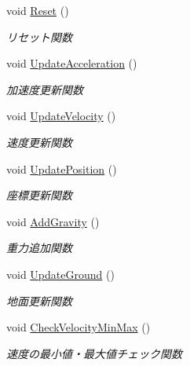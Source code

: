 \begin{DoxyCompactItemize}
\item 
void \mbox{\hyperlink{class_physics_a7ba30ff9f5a0a0a12616ed861f68a20f}{Reset}} ()
\begin{DoxyCompactList}\small\item\em リセット関数 \end{DoxyCompactList}\item 
void \mbox{\hyperlink{class_physics_a122041053c2c4e69cdf6dc92076e1d79}{Update\+Acceleration}} ()
\begin{DoxyCompactList}\small\item\em 加速度更新関数 \end{DoxyCompactList}\item 
void \mbox{\hyperlink{class_physics_abd74d6413b1fd6c77007edf51ea9db4b}{Update\+Velocity}} ()
\begin{DoxyCompactList}\small\item\em 速度更新関数 \end{DoxyCompactList}\item 
void \mbox{\hyperlink{class_physics_a481f06d777c1b1f52dc2c06c71e93932}{Update\+Position}} ()
\begin{DoxyCompactList}\small\item\em 座標更新関数 \end{DoxyCompactList}\item 
void \mbox{\hyperlink{class_physics_a5fb75ffa48210f4e01ab5a199626a3d5}{Add\+Gravity}} ()
\begin{DoxyCompactList}\small\item\em 重力追加関数 \end{DoxyCompactList}\item 
void \mbox{\hyperlink{class_physics_a085300405839f6de506bfe5d0a57fdd5}{Update\+Ground}} ()
\begin{DoxyCompactList}\small\item\em 地面更新関数 \end{DoxyCompactList}\item 
void \mbox{\hyperlink{class_physics_af6ad00988f0aa878285b930121d4748c}{Check\+Velocity\+Min\+Max}} ()
\begin{DoxyCompactList}\small\item\em 速度の最小値・最大値チェック関数 \end{DoxyCompactList}\end{DoxyCompactItemize}
